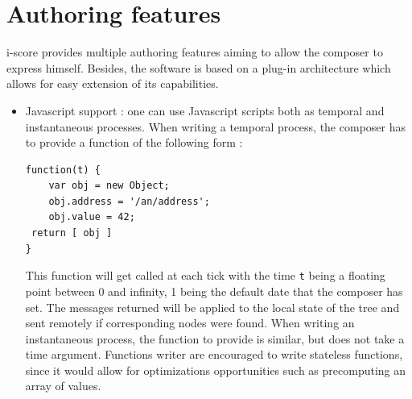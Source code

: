 \documentclass{article}
\begin{document}
\section{Authoring features}
i-score provides multiple authoring features aiming to allow 
the composer to express himself.
Besides, the software is based on a plug-in architecture which 
allows for easy extension of its capabilities.
\begin{itemize}
\item Javascript support : one can use Javascript scripts both as temporal and instantaneous processes.
When writing a temporal process, the composer has to provide a function of the following form : 
\begin{lstlisting}
function(t) {      
    var obj = new Object; 
    obj.address = '/an/address'; 
    obj.value = 42; 
 return [ obj ]
}
\end{lstlisting}
This function will get called at each tick with the time \verb|t| being a floating point between 0 and infinity, 1 being the default date that the composer has set.
The messages returned will be applied to the local state of the tree and sent remotely if corresponding nodes were found.
When writing an instantaneous process, the function to provide is similar, but does not take a time argument.
Functions writer are encouraged to write stateless functions, since it would allow for optimizations opportunities such as precomputing an array of values.


\end{itemize}
\end{document}
